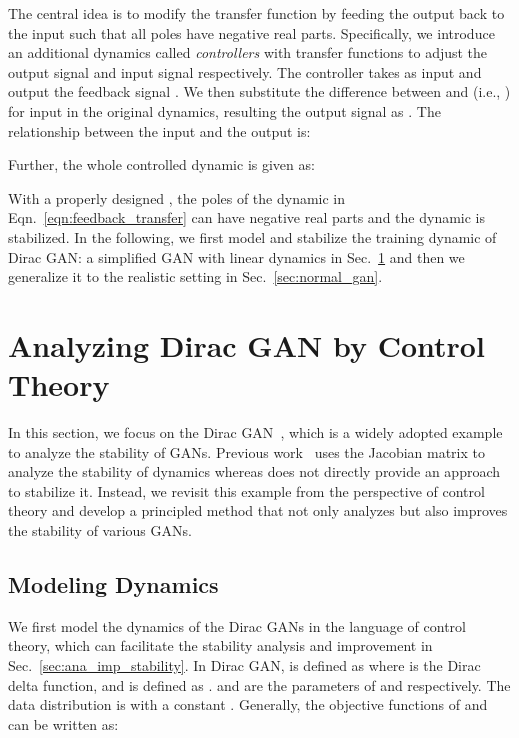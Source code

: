 \documentclass{article}
\newcommand{\eqn}[1]{Eqn.~\eqref{eqn:#1}}
\newcommand{\secref}[1]{Sec.~\ref{sec:#1}} \usepackage{wrapfig}
\theoremstyle{definition}
\begin{document}
The central idea is to modify the transfer function by feeding the output back to the input such that all poles have negative real parts.
Specifically, we introduce an additional dynamics called {\it controllers} with transfer functions  to adjust the output signal and input signal respectively. The controller takes  as input and output the feedback signal . We then substitute the difference between  and  (i.e., ) for input in the original dynamics, resulting the output signal as . The relationship between the input  and the output  is:

Further, the whole controlled dynamic is given as:

With a properly designed , the poles of the dynamic in \eqn{feedback_transfer} can have negative real parts and the dynamic is stabilized. In the following, we first model and stabilize the training dynamic of Dirac GAN: a simplified GAN with linear dynamics in \secref{dirac_gan} and then we generalize it to the realistic setting in \secref{normal_gan}.

\section{Analyzing Dirac GAN by Control Theory}\label{sec:dirac_gan}


In this section, we focus on the Dirac GAN~\cite{mescheder2018training}, which is a widely adopted example to analyze the stability of GANs.
Previous work~\cite{mescheder2017numerics,gidel2018negative} uses the Jacobian matrix to analyze the stability of dynamics whereas does not directly provide an approach to stabilize it. Instead, we revisit this example from the perspective of control theory and develop a principled method that not only analyzes but also improves the stability of various GANs.




\subsection{Modeling Dynamics}
\label{sec:gan_dynamic_model}



We first model the dynamics of the Dirac GANs in the language of control theory, which can facilitate the stability analysis and improvement in \secref{ana_imp_stability}.
In Dirac GAN,  is defined as   where  is the Dirac delta function, and  is defined as .  and   are the parameters of  and  respectively. The data distribution is  with a constant . 
Generally, the objective functions of  and  can be written as:
\end{document}

